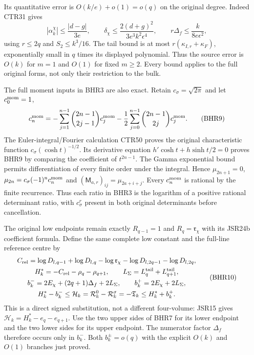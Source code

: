 \documentclass[11pt,a4paper]{article}
\begin{document}
Its quantitative error is $O(k/e)+o(1)=o(q)$ on the
original degree. Indeed CTR31 gives
\[
 |\alpha_k^\chi|\leq\frac{|d-g|}{3e},\qquad
 \delta_\chi\leq\frac{2(d+g)^2}{3e^3k^2\epsilon^4},\qquad
 r\Delta_f\leq\frac{k}{8e\epsilon^2},
 \tag{BHR8}
\]
using $r\leq2q$ and $S_2\leq k^3/16$.
The tail bound is at most
$r(\kappa_{I,r}+\kappa_F)$, exponentially small in $q$
times its displayed polynomial. Thus the source error
is $O(k)$ for $m=1$ and $O(1)$ for fixed $m\geq2$.
Every bound applies to the full original forms, not only
their restriction to the bulk.

The full moment inputs in BHR3 are also exact. Retain
$c_\sigma=\sqrt{2\pi}$ and let $c_0^{\rm mom}=1$,
\[
 c_n^{\rm mom}=-\sum_{j=1}^{n-1}\binom{2n-1}{2j-1}c_j^{\rm mom}
     -\frac12\sum_{j=0}^{n-1}\binom{2n-1}{2j}c_j^{\rm mom}.
 \tag{BHR9}
\]
The Euler-integral/Fourier calculation CTR50 proves the
original characteristic function
$c_\sigma(\cosh t)^{-1/2}$.
Its derivative equation
$h'\cosh t+h\sinh t/2=0$ proves BHR9 by comparing
the coefficient of $t^{2n-1}$. The Gamma exponential
bound permits differentiation of every finite order
under the integral. Hence
$\mu_{2n+1}=0$, $\mu_{2n}=c_\sigma(-1)^nc_n^{\rm mom}$
and $(\mathsf M_{a,r})_{ij}=\mu_{2a+i+j}$.
Every $c_n^{\rm mom}$ is rational by the finite recurrence.
Thus each ratio in BHR3 is the logarithm of a positive
rational determinant ratio, with $c_\sigma^r$ present
in both original determinants before cancellation.

The original low endpoints remain exactly $R_{q-1}=1$
and $R_q=\mathfrak r_\chi$ with its JSR24b coefficient
formula. Define the same complete low constant and the
full-line reference centre by
\[
\begin{gathered}
 C_{\rm rel}=\log D_{l,q-1}+\log D_{l,q}
 -\log\mathfrak r_\chi-\log D_{l,2q-1}-\log D_{l,2q},\\
 H_k^*=-C_{\rm rel}-\rho_q-\rho_{q+1},\qquad
 L_\Sigma=L_q^{\rm tail}+L_{q+1}^{\rm tail},\\
 b_k^-=2E_\chi+(2q+1)\Delta_f+2L_\Sigma,\qquad
 b_k^+=2E_\chi+2L_\Sigma,\\
 H_k^*-b_k^-\leq\mathcal H_k
       =\mathcal R_k^0-\mathcal R_k^\sigma=-\mathfrak T_k
                     \leq H_k^*+b_k^+.
\end{gathered}\tag{BHR10}
\]
This is a direct signed substitution, not a different
four-volume: JSR15 gives
$\mathcal H_k=H_k^*-e_q-e_{q+1}$.
Use the two upper sides of BHR7 for its lower endpoint
and the two lower sides for its upper endpoint.
The numerator factor $\Delta_f$ therefore occurs only
in $b_k^-$. Both $b_k^\pm=o(q)$ with the explicit
$O(k)$ and $O(1)$ branches just proved.
\end{document}
